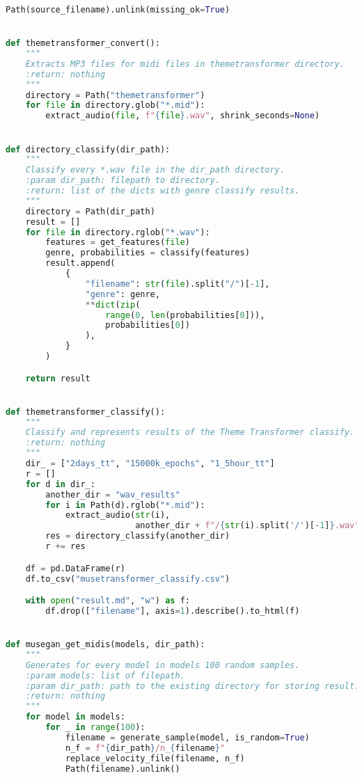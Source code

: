 \begin{lstlisting}[language=Python]
            Path(source_filename).unlink(missing_ok=True)


def themetransformer_convert():
    """
    Extracts MP3 files for midi files in themetransformer directory.
    :return: nothing
    """
    directory = Path("themetransformer")
    for file in directory.glob("*.mid"):
        extract_audio(file, f"{file}.wav", shrink_seconds=None)


def directory_classify(dir_path):
    """
    Classify every *.wav file in the dir_path directory.
    :param dir_path: filepath to directory.
    :return: list of the dicts with genre classify results.
    """
    directory = Path(dir_path)
    result = []
    for file in directory.rglob("*.wav"):
        features = get_features(file)
        genre, probabilities = classify(features)
        result.append(
            {
                "filename": str(file).split("/")[-1],
                "genre": genre,
                **dict(zip(
                    range(0, len(probabilities[0])),
                    probabilities[0])
                ),
            }
        )

    return result


def themetransformer_classify():
    """
    Classify and represents results of the Theme Transformer classify.
    :return: nothing
    """
    dir_ = ["2days_tt", "15000k_epochs", "1_5hour_tt"]
    r = []
    for d in dir_:
        another_dir = "wav_results"
        for i in Path(d).rglob("*.mid"):
            extract_audio(str(i),
                          another_dir + f"/{str(i).split('/')[-1]}.wav")
        res = directory_classify(another_dir)
        r += res

    df = pd.DataFrame(r)
    df.to_csv("musetransformer_classify.csv")

    with open("result.md", "w") as f:
        df.drop(["filename"], axis=1).describe().to_html(f)


def musegan_get_midis(models, dir_path):
    """
    Generates for every model in models 100 random samples.
    :param models: list of filepath.
    :param dir_path: path to the existing directory for storing result.
    :return: nothing
    """
    for model in models:
        for _ in range(100):
            filename = generate_sample(model, is_random=True)
            n_f = f"{dir_path}/n_{filename}"
            replace_velocity_file(filename, n_f)
            Path(filename).unlink()



\end{lstlisting}
